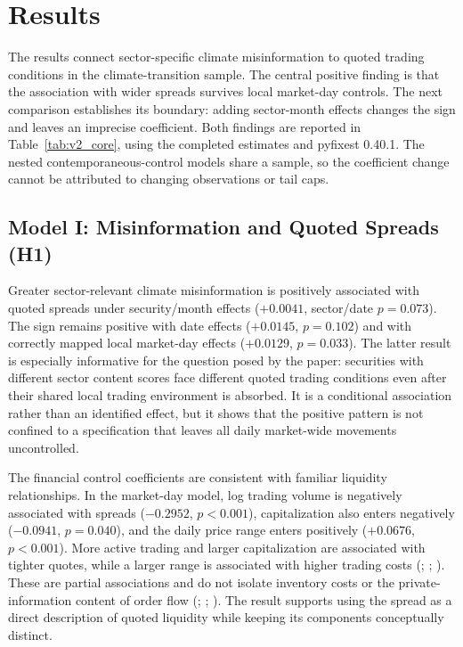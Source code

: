 \documentclass{article}
\theoremstyle{plain}
\begin{document}
\section{Results}
\label{sec:results}

The results connect sector-specific climate misinformation to quoted trading conditions in the climate-transition sample. The central positive finding is that the association with wider spreads survives local market-day controls. The next comparison establishes its boundary: adding sector-month effects changes the sign and leaves an imprecise coefficient. Both findings are reported in Table~\ref{tab:v2_core}, using the completed estimates and pyfixest 0.40.1. The nested contemporaneous-control models share a sample, so the coefficient change cannot be attributed to changing observations or tail caps.



\subsection{Model I: Misinformation and Quoted Spreads (H1)}
\label{sec:results_modelI}

Greater sector-relevant climate misinformation is positively associated with quoted spreads under security/month effects ($+0.0041$, sector/date $p=0.073$). The sign remains positive with date effects ($+0.0145$, $p=0.102$) and with correctly mapped local market-day effects ($+0.0129$, $p=0.033$). The latter result is especially informative for the question posed by the paper: securities with different sector content scores face different quoted trading conditions even after their shared local trading environment is absorbed. It is a conditional association rather than an identified effect, but it shows that the positive pattern is not confined to a specification that leaves all daily market-wide movements uncontrolled.



The financial control coefficients are consistent with familiar liquidity relationships. In the market-day model, log trading volume is negatively associated with spreads ($-0.2952$, $p<0.001$), capitalization also enters negatively ($-0.0941$, $p=0.040$), and the daily price range enters positively ($+0.0676$, $p<0.001$). More active trading and larger capitalization are associated with tighter quotes, while a larger range is associated with higher trading costs (\cite{stoll2000friction}; \cite{chordia2000commonality}; \cite{AmihudMendelson1986}). These are partial associations and do not isolate inventory costs or the private-information content of order flow (\cite{Kyle1985}; \cite{easley1996}; \cite{Hasbrouck1991}). The result supports using the spread as a direct description of quoted liquidity while keeping its components conceptually distinct.
\end{document}
